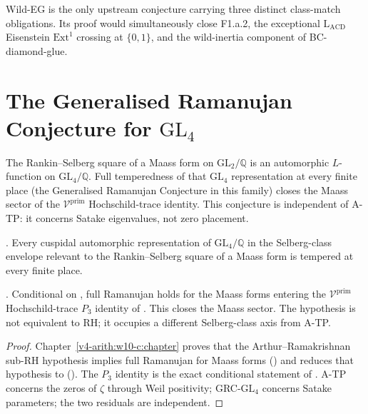 \begin{remark}
\label{v4-arith:w10-final:rem:wild-eg}
Wild-EG is the only upstream conjecture carrying three distinct
class-match obligations. Its proof would simultaneously close F1.a.2,
the exceptional \(\mathrm{L}_{\mathrm{ACD}}\) Eisenstein
\(\mathrm{Ext}^{1}\) crossing at \(\{0,1\}\), and the wild-inertia
component of BC-diamond-glue.
\end{remark}

\section{The Generalised Ramanujan Conjecture for
\texorpdfstring{\(\mathrm{GL}_{4}\)}{GL\_4}}
\label{v4-arith:w10-final:sub-rh}

The Rankin--Selberg square of a Maass form on \(\mathrm{GL}_{2}/\mathbb{Q}\)
is an automorphic \(L\)-function on \(\mathrm{GL}_{4}/\mathbb{Q}\).
Full temperedness of that \(\mathrm{GL}_{4}\) representation at every
finite place (the Generalised Ramanujan Conjecture in this family)
closes the Maass sector of the \(\mathcal{V}^{\mathrm{prim}}\)
Hochschild-trace identity. This conjecture is independent of A-TP:
it concerns Satake eigenvalues, not zero placement.

\begin{hypothesis}
\label{v4-arith:w10-final:hyp:GRC-GL4}
\ClaimStatusConditional. Every cuspidal automorphic representation of
\(\mathrm{GL}_{4}/\mathbb{Q}\) in the Selberg-class envelope relevant to
the Rankin--Selberg square of a Maass form is tempered at every finite
place.
\end{hypothesis}

\begin{proposition}
\label{v4-arith:w10-final:prop:GRC-GL4}
\ClaimStatusProvedHere. Conditional on
, full Ramanujan holds for the
Maass forms entering the \(\mathcal{V}^{\mathrm{prim}}\)
Hochschild-trace \(P_{3}\) identity of .
This closes the Maass sector. The hypothesis is not equivalent to RH;
it occupies a different Selberg-class axis from A-TP.
\end{proposition}

\begin{proof}
Chapter~\ref{v4-arith:w10-c:chapter} proves that the Arthur--Ramakrishnan
sub-RH hypothesis implies full Ramanujan for Maass forms
() and reduces that
hypothesis to 
(). The \(P_{3}\) identity
is the exact conditional statement of .
A-TP concerns the zeros of \(\zeta\) through Weil positivity;
GRC-\(\mathrm{GL}_{4}\) concerns Satake parameters; the two residuals
are independent.
\end{proof}

